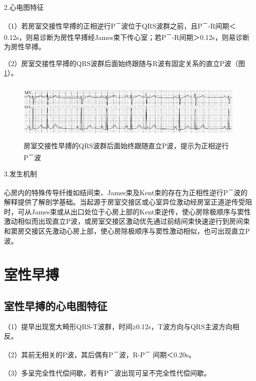 2.心电图特征

（1）若房室交接性早搏的正相逆行P\textsuperscript{－}波位于QRS波群之前，且P\textsuperscript{－}-R间期＜0.12s，则易诊断为房性早搏经James束下传心室；若P\textsuperscript{－}-R间期＞0.12s，则易诊断为房性早搏。

（2）房室交接性早搏的QRS波群后面始终跟随与R波有固定关系的直立P波（图\ref{fig11-18}）。

\begin{figure}[!htbp]
 \centering
 \includegraphics[width=5.58333in,height=1.14583in]{./images/Image00178.jpg}
 \captionsetup{justification=centering}
 \caption{房室交接性早搏的QRS波群后面始终跟随直立P波，提示为正相逆行P\textsuperscript{－}波}
 \label{fig11-18}
  \end{figure} 


3.发生机制

心房内的特殊传导纤维如结间束、James束及Kent束的存在为正相性逆行P\textsuperscript{－}波的解释提供了解剖学基础。当起源于房室交接区或心室异位激动经房室正道逆传受阻时，可从James束或从出口处位于心房上部的Kent束逆传，使心房除极顺序与窦性激动相似而出现直立P波，或房室交接区激动优先通过前结间束快速逆行到房间束和窦房交接区先激动心房上部，使心房除极顺序与窦性激动相似，也可出现直立P波。

\protect\hypertarget{text00018.htmlux5cux23subid150}{}{}

\section{室性早搏}

\protect\hypertarget{text00018.htmlux5cux23subid151}{}{}

\subsection{室性早搏的心电图特征}

（1）提早出现宽大畸形QRS-T波群，时间≥0.12s，T波方向与QRS主波方向相反。

（2）其前无相关的P波，其后偶有P\textsuperscript{－}波，R-P\textsuperscript{－} 间期＜0.20s。

（3）多呈完全性代偿间歇，若有P\textsuperscript{－}波出现可呈不完全性代偿间歇。

